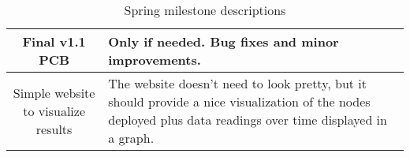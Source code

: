 \begin{table}[H]
\begin{tabularx}{\linewidth}{|c|X|}
        \hline
        Final v1.1 PCB
        & Only if needed. Bug fixes and minor improvements.
        \\
        
        \hline
        Simple website to visualize results
        & The website doesn't need to look pretty, but it should provide a nice visualization of the nodes deployed plus data readings over time displayed in a graph.
        \\
        
        \hline
    \end{tabularx}
    \caption{Spring milestone descriptions}
\end{table}

